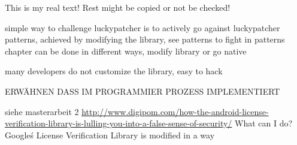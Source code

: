 This is my real text! Rest might be copied or not be checked!

%
simple way to challenge luckypatcher is to actively go against luckypatcher patterns, achieved by modifying the library, see patterns to fight in patterns chapter
can be done in different ways, modify library or go native

many developers do not customize the library, easy to hack
\cite{munteanLicense}
%

ERWÄHNEN DASS IM PROGRAMMIER PROZESS  IMPLEMENTIERT\newline

siehe masterarbeit 2
\url{http://www.digipom.com/how-the-android-license-verification-library-is-lulling-you-into-a-false-sense-of-security/} What can I do?
\newline
 Google\'s License Verification Library is modified in a way
